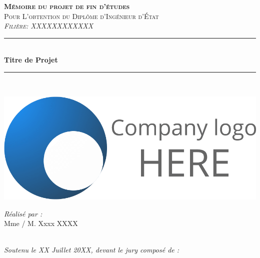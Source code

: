 \vspace{0.9cm}
\begin{center}
{\large \textsc{\textbf{Mémoire du projet de fin d'études}}}\\[0.1cm]
{\large \textsc{Pour L'obtention du Diplôme d'Ingénieur d'État}}\\[0.1cm]
{\large \textsc{\textit{Filière: XXXXXXXXXXXX}}} \\[0.05cm] 
\vspace{-0.04cm}
\rule{\linewidth}{0.3mm} \\[0.4cm]   %
 { \huge \textbf{ Titre de Projet }} \\[0.15cm] 
\rule{\linewidth}{0.3mm} \\[0.4cm]
\vspace{0.4cm}

\includegraphics[scale=0.075]{Logos/Company_Logo_Expl.png}  %

\vspace{1cm}

\noindent
\begin{minipage}{0.9\textwidth}
    \vspace{-7mm}
  \begin{flushleft} \large
    \emph{Réalisé par :}\\
    Mme / M. Xxxx \textsc{XXXX} %
  \end{flushleft}
\end{minipage}
\begin{minipage}{0.4\textwidth}

\end{minipage}\\[0.6cm]

{\large \textit{Soutenu le XX Juillet 20XX, devant le jury composé de : }}\\[0.5cm]



\end{center}
